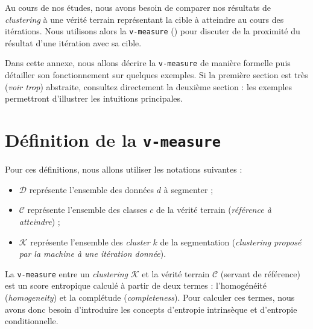 \DontFrameThisInToc
{}
\label{annex:D-ANNEXE-EVALUATION-CLUSTERING}

	Au cours de nos études, nous avons besoin de comparer nos résultats de \textit{clustering} à une vérité terrain représentant la cible à atteindre au cours des itérations.
	Nous utilisons alors la \texttt{v-measure} (\cite{rosenberg-hirschberg:2007:vmeasure-conditional-entropybased}) pour discuter de la proximité du résultat d'une itération avec sa cible.
	
	\begin{leftBarAuthorOpinion}
		Dans cette annexe, nous allons décrire la \texttt{v-measure} de manière formelle puis détailler son fonctionnement sur quelques exemples.
		Si la première section est très (\textit{voir trop}) abstraite, consultez directement la deuxième section : les exemples permettront d'illustrer les intuitions principales.
	\end{leftBarAuthorOpinion}
	
	\minitoc

	\newpage
	\section{Définition de la \texttt{v-measure}}
	\label{annex:D.1-ANNEXE-EVALUATION-CLUSTERING-DEFINITION}
		
		Pour ces définitions, nous allons utiliser les notations suivantes :
		\begin{itemize}
			\item $\mathcal{D}$ représente l'ensemble des données $d$ à segmenter ;
			\item $\mathcal{C}$ représente l'ensemble des classes $c$ de la vérité terrain (\textit{référence à atteindre}) ;
			\item $\mathcal{K}$ représente l'ensemble des \textit{cluster} $k$ de la segmentation (\textit{clustering proposé par la machine à une itération donnée}).
		\end{itemize}
		
		
		La \texttt{v-measure} entre un \textit{clustering} $\mathcal{K}$ et la vérité terrain $\mathcal{C}$ (servant de référence) est un score entropique calculé à partir de deux termes : l'homogénéité (\textit{homogeneity}) et la complétude (\textit{completeness}).
		Pour calculer ces termes, nous avons donc besoin d'introduire les concepts d'entropie intrinsèque et d'entropie conditionnelle.
		\newline
		
